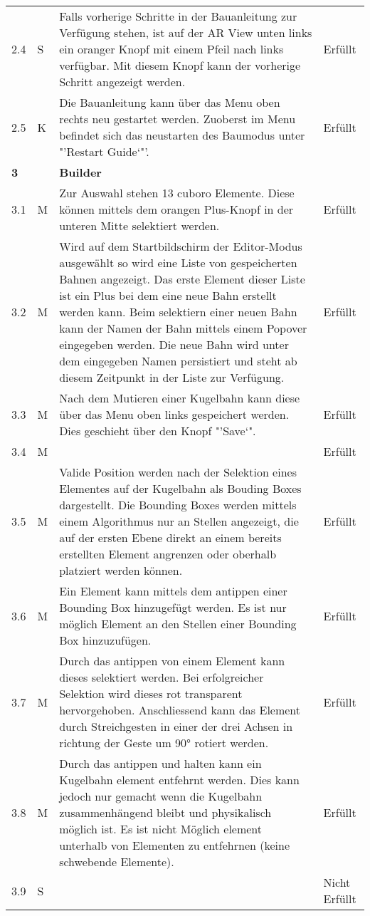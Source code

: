 \begin{longtable}{l l p{10cm} l}
	2.4 & S & Falls vorherige Schritte in der Bauanleitung zur Verfügung stehen, ist auf der AR View unten links ein oranger Knopf mit einem Pfeil nach links verfügbar. Mit diesem Knopf kann der vorherige Schritt angezeigt werden. & Erfüllt \\
	2.5 & K & Die Bauanleitung kann über das Menu oben rechts neu gestartet werden. Zuoberst im Menu befindet sich das neustarten des Baumodus unter "'Restart Guide`"'. & Erfüllt \\
	\hline
	\textbf{3} & & \textbf{Builder} & \\
	\hline
	3.1 & M & Zur Auswahl stehen 13 cuboro Elemente. Diese können mittels dem orangen Plus-Knopf in der unteren Mitte selektiert werden. & Erfüllt \\
	3.2 & M & Wird auf dem Startbildschirm der Editor-Modus ausgewählt so wird eine Liste von gespeicherten Bahnen angezeigt. Das erste Element dieser Liste ist ein Plus bei dem eine neue Bahn erstellt werden kann. Beim selektiern einer neuen Bahn kann der Namen der Bahn mittels einem Popover eingegeben werden. Die neue Bahn wird unter dem eingegeben Namen persistiert und steht ab diesem Zeitpunkt in der Liste zur Verfügung. & Erfüllt \\
	3.3 & M & Nach dem Mutieren einer Kugelbahn kann diese über das Menu oben links gespeichert werden. Dies geschieht über den Knopf "'Save`". & Erfüllt \\
	3.4 & M & & Erfüllt \\
	3.5 & M & Valide Position werden nach der Selektion eines Elementes auf der Kugelbahn als Bouding Boxes dargestellt. Die Bounding Boxes werden mittels einem Algorithmus nur an Stellen angezeigt, die auf der ersten Ebene direkt an einem bereits erstellten Element angrenzen oder oberhalb platziert werden können. & Erfüllt \\
	3.6 & M & Ein Element kann mittels dem antippen einer Bounding Box hinzugefügt werden. Es ist nur möglich Element an den Stellen einer Bounding Box hinzuzufügen. & Erfüllt \\
	3.7 & M & Durch das antippen von einem Element kann dieses selektiert werden. Bei erfolgreicher Selektion wird dieses rot transparent hervorgehoben. Anschliessend kann das Element durch Streichgesten in einer der drei Achsen in richtung der Geste um 90° rotiert werden. & Erfüllt \\
	3.8 & M & Durch das antippen und halten kann ein Kugelbahn element entfehrnt werden. Dies kann jedoch nur gemacht wenn die Kugelbahn zusammenhängend bleibt und physikalisch möglich ist. Es ist nicht Möglich element unterhalb von Elementen zu entfehrnen (keine schwebende Elemente). & Erfüllt \\
	3.9 & S & & Nicht Erfüllt \\
\end{longtable}